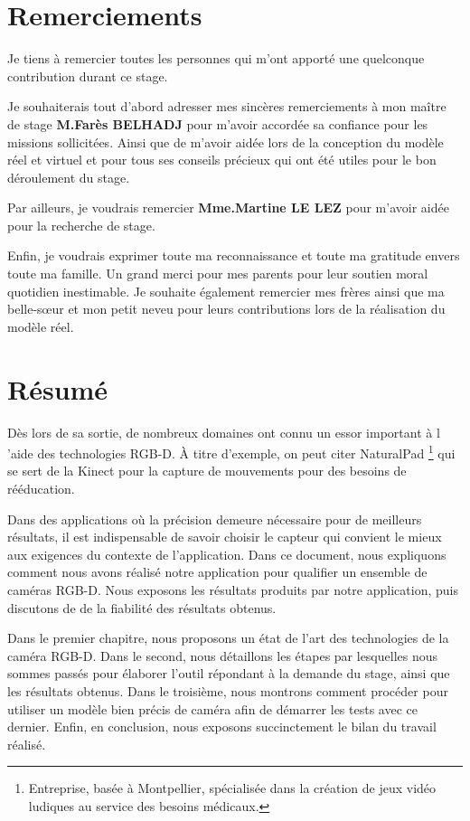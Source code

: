 \documentclass[a4paper, 12pt]{book}
\begin{document}
\chapter*{Remerciements}
 Je tiens à remercier toutes les personnes qui m'ont apporté une quelconque contribution durant ce stage.\\
\par Je souhaiterais tout d'abord adresser mes sincères remerciements à mon maître de stage \textbf{M.Farès BELHADJ} pour m'avoir accordée sa confiance pour les missions sollicitées. Ainsi que de m'avoir aidée lors de la conception du modèle réel et virtuel et pour tous ses conseils précieux qui ont été utiles pour le bon déroulement du stage. \\
\par Par ailleurs, je voudrais remercier \textbf{Mme.Martine LE LEZ} pour m'avoir aidée pour la recherche de stage.\\
\par Enfin, je voudrais exprimer toute ma reconnaissance et toute ma gratitude envers toute ma famille. Un grand merci pour mes parents pour leur soutien moral quotidien inestimable. Je souhaite également remercier mes frères ainsi que ma belle-sœur et mon petit neveu pour leurs contributions lors de la réalisation du modèle réel. 

\chapter*{Résumé}
Dès lors de sa sortie, de nombreux domaines ont connu un essor important à l 'aide des technologies RGB-D. À titre d'exemple, on peut citer NaturalPad \footnote{Entreprise, basée à Montpellier, spécialisée dans la création de jeux vidéo ludiques au service des besoins médicaux.} qui se sert de la Kinect pour la capture de mouvements pour des besoins de rééducation.	
\par Dans des applications où la précision demeure nécessaire pour de meilleurs résultats, il est indispensable de savoir choisir le capteur qui convient le mieux aux exigences du contexte de l'application.
Dans ce document, nous expliquons comment nous avons réalisé notre application pour qualifier un ensemble de caméras RGB-D. Nous exposons les résultats produits par notre application, puis discutons de de la fiabilité des résultats obtenus.
\par Dans le premier chapitre, nous proposons un état de l'art des technologies de la caméra RGB-D. Dans le second, nous détaillons les étapes par lesquelles nous sommes passés pour élaborer l'outil répondant à la demande du stage, ainsi que les résultats obtenus. Dans le troisième, nous montrons comment procéder pour utiliser un modèle bien précis de caméra afin de démarrer les tests avec ce dernier. Enfin, en conclusion, nous exposons succinctement le bilan du travail réalisé.
\end{document}
